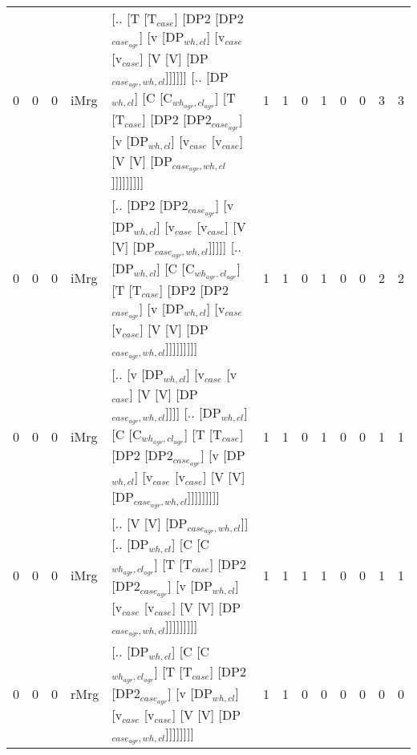 \begin{tabularx}{\linewidth}{rrrlXrrrrrrrr}
   0 &       0 &   0 & iMrg & [.. [T [T$_{case}$] [DP2 [DP2$_{case_{agr}}$] [v [DP$_{wh,cl}$] [v$_{case}$ [v$_{case}$] [V [V] [DP$_{case_{agr},wh,cl}$]]]]]] [.. [DP$_{wh,cl}$] [C [C$_{wh_{agr},cl_{agr}}$] [T [T$_{case}$] [DP2 [DP2$_{case_{agr}}$] [v [DP$_{wh,cl}$] [v$_{case}$ [v$_{case}$] [V [V] [DP$_{case_{agr},wh,cl}$]]]]]]]]]                       &             1 &             1 &                  0 &            1 &                0 &              0 &        3 &        3 \\
   0 &       0 &   0 & iMrg & [.. [DP2 [DP2$_{case_{agr}}$] [v [DP$_{wh,cl}$] [v$_{case}$ [v$_{case}$] [V [V] [DP$_{case_{agr},wh,cl}$]]]]] [.. [DP$_{wh,cl}$] [C [C$_{wh_{agr},cl_{agr}}$] [T [T$_{case}$] [DP2 [DP2$_{case_{agr}}$] [v [DP$_{wh,cl}$] [v$_{case}$ [v$_{case}$] [V [V] [DP$_{case_{agr},wh,cl}$]]]]]]]]]                                    &             1 &             1 &                  0 &            1 &                0 &              0 &        2 &        2 \\
   0 &       0 &   0 & iMrg & [.. [v [DP$_{wh,cl}$] [v$_{case}$ [v$_{case}$] [V [V] [DP$_{case_{agr},wh,cl}$]]]] [.. [DP$_{wh,cl}$] [C [C$_{wh_{agr},cl_{agr}}$] [T [T$_{case}$] [DP2 [DP2$_{case_{agr}}$] [v [DP$_{wh,cl}$] [v$_{case}$ [v$_{case}$] [V [V] [DP$_{case_{agr},wh,cl}$]]]]]]]]]                                                         &             1 &             1 &                  0 &            1 &                0 &              0 &        1 &        1 \\
   0 &       0 &   0 & iMrg & [.. [V [V] [DP$_{case_{agr},wh,cl}$]] [.. [DP$_{wh,cl}$] [C [C$_{wh_{agr},cl_{agr}}$] [T [T$_{case}$] [DP2 [DP2$_{case_{agr}}$] [v [DP$_{wh,cl}$] [v$_{case}$ [v$_{case}$] [V [V] [DP$_{case_{agr},wh,cl}$]]]]]]]]]                                                                                          &             1 &             1 &                  1 &            1 &                0 &              0 &        1 &        1 \\
   0 &       0 &   0 & rMrg & [.. [DP$_{wh,cl}$] [C [C$_{wh_{agr},cl_{agr}}$] [T [T$_{case}$] [DP2 [DP2$_{case_{agr}}$] [v [DP$_{wh,cl}$] [v$_{case}$ [v$_{case}$] [V [V] [DP$_{case_{agr},wh,cl}$]]]]]]]]                                                                                                                           &             1 &             1 &                  0 &            0 &                0 &              0 &        0 &        0 \\
\hline
\end{tabularx}\endgroup\\
